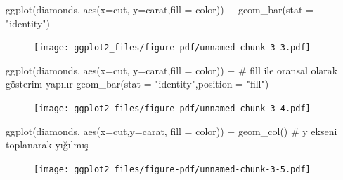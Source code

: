 \documentclass[
  letterpaper,
  DIV=11,
  numbers=noendperiod]{scrreprt}
\newenvironment{Shaded}{\begin{snugshade}}{\end{snugshade}}
\newcommand{\AttributeTok}[1]{\textcolor[rgb]{0.40,0.45,0.13}{#1}}
\newcommand{\CommentTok}[1]{\textcolor[rgb]{0.37,0.37,0.37}{#1}}
\newcommand{\FunctionTok}[1]{\textcolor[rgb]{0.28,0.35,0.67}{#1}}
\newcommand{\NormalTok}[1]{\textcolor[rgb]{0.00,0.23,0.31}{#1}}
\newcommand{\SpecialCharTok}[1]{\textcolor[rgb]{0.37,0.37,0.37}{#1}}
\newcommand{\StringTok}[1]{\textcolor[rgb]{0.13,0.47,0.30}{#1}}
\begin{document}
\begin{Shaded}
\begin{Highlighting}[]
\FunctionTok{ggplot}\NormalTok{(diamonds, }\FunctionTok{aes}\NormalTok{(}\AttributeTok{x=}\NormalTok{cut, }\AttributeTok{y=}\NormalTok{carat,}\AttributeTok{fill =}\NormalTok{ color)) }\SpecialCharTok{+}
  \FunctionTok{geom\_bar}\NormalTok{(}\AttributeTok{stat =} \StringTok{"identity"}\NormalTok{) }
\end{Highlighting}
\end{Shaded}

\begin{figure}[H]

{\centering \texttt{[image: ggplot2\_files/figure-pdf/unnamed-chunk-3-3.pdf]}

}

\end{figure}

\begin{Shaded}
\begin{Highlighting}[]
\FunctionTok{ggplot}\NormalTok{(diamonds, }\FunctionTok{aes}\NormalTok{(}\AttributeTok{x=}\NormalTok{cut, }\AttributeTok{y=}\NormalTok{carat,}\AttributeTok{fill =}\NormalTok{ color)) }\SpecialCharTok{+}
  \CommentTok{\# fill ile oransal olarak gösterim yapılır}
  \FunctionTok{geom\_bar}\NormalTok{(}\AttributeTok{stat =} \StringTok{"identity"}\NormalTok{,}\AttributeTok{position =} \StringTok{"fill"}\NormalTok{) }
\end{Highlighting}
\end{Shaded}

\begin{figure}[H]

{\centering \texttt{[image: ggplot2\_files/figure-pdf/unnamed-chunk-3-4.pdf]}

}

\end{figure}

\begin{Shaded}
\begin{Highlighting}[]
\FunctionTok{ggplot}\NormalTok{(diamonds, }\FunctionTok{aes}\NormalTok{(}\AttributeTok{x=}\NormalTok{cut,}\AttributeTok{y=}\NormalTok{carat, }\AttributeTok{fill =}\NormalTok{ color)) }\SpecialCharTok{+}
  \FunctionTok{geom\_col}\NormalTok{() }\CommentTok{\# y ekseni toplanarak yığılmış}
\end{Highlighting}
\end{Shaded}

\begin{figure}[H]

{\centering \texttt{[image: ggplot2\_files/figure-pdf/unnamed-chunk-3-5.pdf]}

}

\end{figure}
\end{document}
